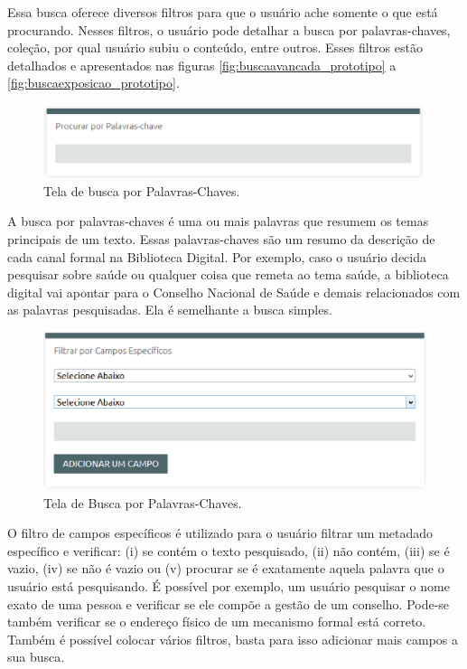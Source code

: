 Essa busca oferece diversos filtros para que o usuário ache somente o que está procurando. Nesses filtros, o usuário pode detalhar a busca por palavras-chaves, coleção, por qual usuário subiu o conteúdo, entre outros. Esses filtros estão detalhados e apresentados nas figuras \ref{fig:buscaavancada_prototipo} a \ref{fig:buscaexposicao_prototipo}.

\graphicspath{{figuras/prototipo/}}
\begin{figure}[H]
\centering
\includegraphics[width=1.0\textwidth]{busca-palavra-chave}
\caption{Tela de busca por Palavras-Chaves.}
\label{fig:buscachaves_prototipo}
\end{figure}

A busca por palavras-chaves é uma ou mais palavras que resumem os temas principais de um texto. Essas palavras-chaves são um resumo da descrição de cada canal formal na Biblioteca Digital.  Por exemplo, caso o usuário decida pesquisar sobre saúde ou qualquer coisa que remeta ao tema saúde, a biblioteca digital vai apontar para o Conselho Nacional de Saúde e demais relacionados com as palavras pesquisadas. Ela é semelhante a busca simples.

\graphicspath{{figuras/prototipo/}}
\begin{figure}[H]
\centering
\includegraphics[width=1.0\textwidth]{busca-assunto-especifico}
\caption{Tela de Busca por Palavras-Chaves.}
\label{fig:buscaespecifico_prototipo}
\end{figure}

O filtro de campos específicos é utilizado para o usuário filtrar um metadado específico e verificar: (i) se contém o texto pesquisado, (ii) não contém, (iii) se é vazio, (iv) se não é vazio ou (v) procurar se é exatamente aquela palavra que o usuário está pesquisando. É possível por exemplo, um usuário pesquisar o nome exato de uma pessoa e verificar se ele compõe a gestão de um conselho. Pode-se também verificar se o endereço físico de um mecanismo formal está correto. Também é possível colocar vários filtros, basta para isso adicionar mais campos a sua busca.

